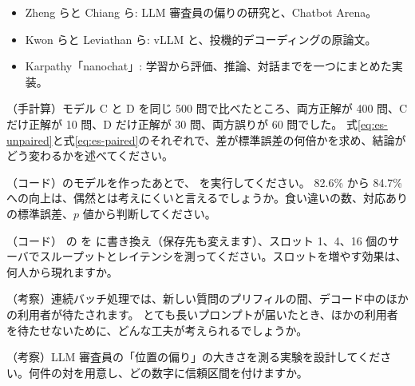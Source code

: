 \begin{itemize}
\item Zheng ら\cite{zheng2023judging}と Chiang ら\cite{chiang2024chatbot}: LLM 審査員の偏りの研究と、Chatbot Arena。
\item Kwon ら\cite{kwon2023efficient}と Leviathan ら\cite{leviathan2023fast}: vLLM と、投機的デコーディングの原論文。
\item Karpathy「nanochat」\cite{karpathy2025nanochat}: 学習から評価、推論、対話までを一つにまとめた実装。
\end{itemize}

\begin{exercises}
\item （手計算）モデル C と D を同じ 500 問で比べたところ、両方正解が 400 問、C だけ正解が 10 問、D だけ正解が 30 問、両方誤りが 60 問でした。
式\eqref{eq:es-unpaired}と式\eqref{eq:es-paired}のそれぞれで、差が標準誤差の何倍かを求め、結論がどう変わるかを述べてください。
\item （コード）のモデルを作ったあとで、 を実行してください。
82.6\% から 84.7\% への向上は、偶然とは考えにくいと言えるでしょうか。食い違いの数、対応ありの標準誤差、$p$ 値から判断してください。
\item （コード） の \code{[1, 16]} を \code{[1, 4, 16]} に書き換え（保存先も変えます）、スロット 1、4、16 個のサーバでスループットとレイテンシを測ってください。スロットを増やす効果は、何人から現れますか。
\item （考察）連続バッチ処理では、新しい質問のプリフィルの間、デコード中のほかの利用者が待たされます。
とても長いプロンプトが届いたとき、ほかの利用者を待たせないために、どんな工夫が考えられるでしょうか。
\item （考察）LLM 審査員の「位置の偏り」の大きさを測る実験を設計してください。何件の対を用意し、どの数字に信頼区間を付けますか。
\end{exercises}
